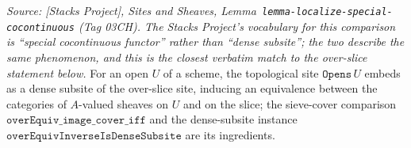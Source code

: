\begin{lemma}
  \label{lem:over_slice_sheaf_equiv}
  \textit{Source: [Stacks Project], Sites and Sheaves,
  Lemma~\texttt{lemma-localize-special-cocontinuous} (Tag 03CH). The Stacks Project's
  vocabulary for this comparison is ``special cocontinuous functor'' rather than
  ``dense subsite''; the two describe the same phenomenon, and this is the closest
  verbatim match to the over-slice statement below.}
  For an open \(U\) of a scheme, the topological site \(\mathtt{Opens}\,U\) embeds as a
  dense subsite of the over-slice site, inducing an equivalence between the categories of
  \(A\)-valued sheaves on \(U\) and on the slice; the sieve-cover comparison
  \(\mathtt{overEquiv\_image\_cover\_iff}\) and the dense-subsite instance
  \(\mathtt{overEquivInverseIsDenseSubsite}\) are its ingredients.
\end{lemma}
